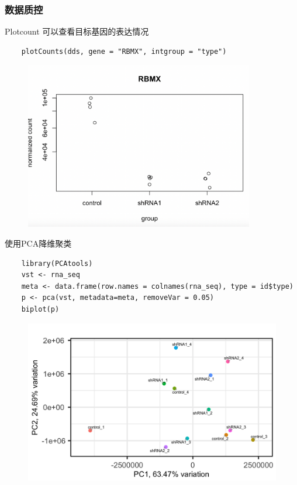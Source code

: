 \subsubsection{数据质控}
Plotcount 可以查看目标基因的表达情况
\begin{lstlisting}
    plotCounts(dds, gene = "RBMX", intgroup = "type")
\end{lstlisting}

\begin{figure}[ht]
    \includegraphics[width=10cm]{image/rnaseq/qc2.png}
\end{figure}

使用PCA降维聚类
\begin{lstlisting}
    library(PCAtools)
    vst <- rna_seq
    meta <- data.frame(row.names = colnames(rna_seq), type = id$type)
    p <- pca(vst, metadata=meta, removeVar = 0.05)
    biplot(p)
\end{lstlisting}

\begin{figure}[ht]
    \includegraphics[width=13cm]{image/rnaseq/pca.png}
\end{figure}

